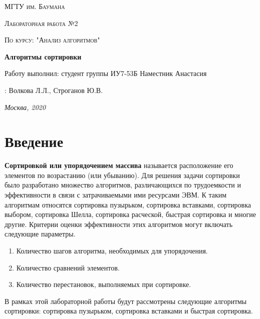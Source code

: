 \documentclass[12pt]{report}
\begin{document}
 
\begin{titlepage}
	\centering
	{\scshape\LARGE МГТУ им. Баумана \par}
	\vspace{3cm}
	{\scshape\Large Лабораторная работа №2\par}
	\vspace{0.5cm}	
	{\scshape\Large По курсу: "Анализ алгоритмов"\par}
	\vspace{1.5cm}
	{\huge\bfseries Алгоритмы сортировки\par}
	\vspace{2cm}
	\Large Работу выполнил: студент группы ИУ7-53Б Наместник Анастасия\par
	\vspace{0.5cm}
	:  Волкова Л.Л., Строганов Ю.В.\par

	\vfill
	\large \textit {Москва, 2020} \par
\end{titlepage}

\tableofcontents

\newpage
\chapter*{Введение}

\textbf{            		Сортировкой или упорядочением массива} называется расположение его элементов по возрастанию (или убыванию).  Для решения задачи сортировки было разработано множество алгоритмов, различающихся по трудоемкости и эффективности в связи с затрачиваемыми ими ресурсами ЭВМ. К таким алгоритмам относятся сортировка пузырьком, сортировка вставками, сортировка выбором, сортировка Шелла, сортировка расческой, быстрая сортировка и многие другие. Критерии оценки эффективности этих алгоритмов могут включать следующие параметры.
\begin{enumerate}
\item Количество шагов алгоритма, необходимых для упорядочения.
\item Количество сравнений элементов.
\item Количество перестановок, выполняемых при сортировке.
\end{enumerate}

 В рамках этой лабораторной работы будут рассмотрены следующие алгоритмы сортировки: сортировка пузырьком,  сортировка вставками и быстрая сортировка.
\end{document}

